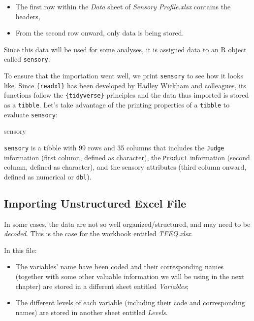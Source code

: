 \documentclass[
]{book}
\newenvironment{Shaded}{\begin{snugshade}}{\end{snugshade}}
\newcommand{\NormalTok}[1]{#1}
\providecommand{\tightlist}{%
  \setlength{\itemsep}{0pt}\setlength{\parskip}{0pt}}
\begin{document}
\begin{itemize}
\tightlist
\item
  The first row within the \emph{Data} sheet of \emph{Sensory Profile.xlsx} contains the headers,\\
\item
  From the second row onward, only data is being stored.
\end{itemize}

Since this data will be used for some analyses, it is assigned data to an R object called \texttt{sensory}.

To ensure that the importation went well, we print \texttt{sensory} to see how it looks like. Since \texttt{\{readxl\}} has been developed by Hadley Wickham and colleagues, its functions follow the \texttt{\{tidyverse\}} principles and the data thus imported is stored as a \texttt{tibble}. Let's take advantage of the printing properties of a \texttt{tibble} to evaluate \texttt{sensory}:

\begin{Shaded}
\begin{Highlighting}[]
\NormalTok{sensory}
\end{Highlighting}
\end{Shaded}

\texttt{sensory} is a tibble with 99 rows and 35 columns that includes the \texttt{Judge} information (first column, defined as character), the \texttt{Product} information (second column, defined as character), and the sensory attributes (third column onward, defined as numerical or \texttt{dbl}).

\hypertarget{importing-unstructured-excel-file}{%
\subsection{Importing Unstructured Excel File}\label{importing-unstructured-excel-file}}

In some cases, the data are not so well organized/structured, and may need to be \emph{decoded}. This is the case for the workbook entitled \emph{TFEQ.xlsx}.

In this file:

\begin{itemize}
\tightlist
\item
  The variables' name have been coded and their corresponding names (together with some other valuable information we will be using in the next chapter) are stored in a different sheet entitled \emph{Variables};
\item
  The different levels of each variable (including their code and corresponding names) are stored in another sheet entitled \emph{Levels}.
\end{itemize}
\end{document}
